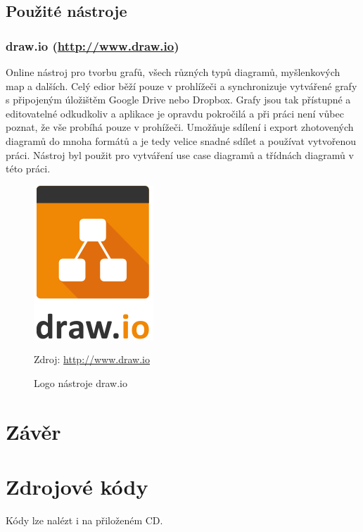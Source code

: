 \documentclass{article}
\numberwithin{equation}{section}
\begin{document}
\subsection{Použité nástroje}
\subsubsection{draw.io (\url{http://www.draw.io})}
Online nástroj pro tvorbu grafů, všech různých typů diagramů, myšlenkových map a dalších.
Celý edior běží pouze v prohlížeči a synchronizuje vytvářené grafy s připojeným úložištěm
Google Drive nebo Dropbox. Grafy jsou tak přístupné  a editovatelné odkudkoliv a aplikace
je opravdu pokročilá a při práci není vůbec poznat, že vše probíhá pouze v prohížeči.
Umožňuje sdílení i export zhotovených diagramů do mnoha formátů a je tedy velice snadné
sdílet a používat vytvořenou práci.
Nástroj byl použit pro vytváření use case diagramů a třídnách diagramů v této práci.
\begin{figure}[H]
        \centering
                \includegraphics[scale=0.2]{img/drawiologo.png}
        \caption{Logo nástroje draw.io}
        \label{fig:iologo}
        \centering Zdroj: \url{http://www.draw.io}
\end{figure}




\section{Závěr}


\begin{thebibliography}{99}

\end{thebibliography}

  \appendix

  \section{Zdrojové kódy}
  Kódy lze nalézt i na přiloženém CD.
\end{document}
